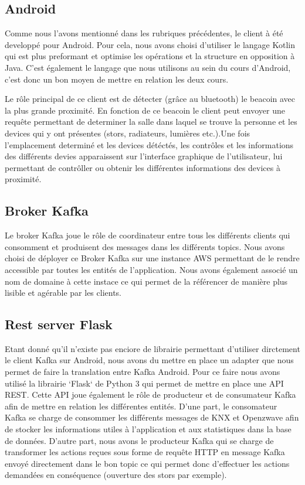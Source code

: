 \subsection{Android}
Comme nous l'avons mentionné dans les rubriques précédentes, le client à été developpé pour Android. Pour cela, nous avons choisi d'utiliser le langage Kotlin qui est plus preformant et optimise les opérations et la structure en opposition à Java. C'est également le langage que nous utilisons au sein du cours d'Android, c'est donc un bon moyen de mettre en relation les deux cours.

Le rôle principal de ce client est de détecter (grâce au bluetooth) le beacoin avec la plus grande proximité. En fonction de ce beacoin le client peut envoyer une requête permettant de determiner la salle dans laquel se trouve la personne et les devices qui y ont présentes (stors, radiateurs, lumières etc.).Une fois l'emplacement determiné et les devices détéctés, les contrôles et les informations des différents devies apparaissent sur l'interface graphique de l'utilisateur, lui permettant de contrôller ou obtenir les différentes informations des devices à proximité. 

\subsection{Broker Kafka}
Le broker Kafka joue le rôle de coordinateur entre tous les différents clients qui consomment et produisent des messages dans les différents topics.
Nous avons choisi de déployer ce Broker Kafka sur une instance AWS permettant de le rendre accessible par toutes les entités de l'application.
Nous avons également associé un nom de domaine à cette instace ce qui permet de la référencer de manière plus lisible et agérable par les clients.

\subsection{Rest server Flask}
Etant donné qu'il n'existe pas enciore de librairie permettant d'utiliser dirctement le client Kafka sur Android, nous avons du mettre en place un adapter que nous permet de faire la translation entre Kafka Android.
Pour ce faire nous avons utilisé la librairie `Flask` de Python 3 qui permet de mettre en place une API REST.
Cette API joue également le rôle de producteur et de consumateur Kafka afin de mettre en relation les différentes entités.
D'une part, le consomateur Kafka se charge de consommer les différents messages de KNX et Openzwave afin de stocker les informations utiles à l'application et aux statistiques dans la base de données.
D'autre part, nous avons le producteur Kafka qui se charge de transformer les actions reçues sous forme de requête HTTP en message Kafka envoyé directement dans le bon topic ce qui permet donc d'effectuer les actions demandées en conséquence (ouverture des stors par exemple).

